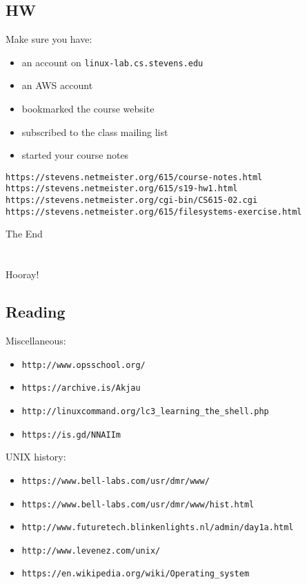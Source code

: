 \documentclass[xga]{xdvislides}
\begin{document}
\subsection{HW}
Make sure you have:
\begin{itemize}
	\item an account on {\tt linux-lab.cs.stevens.edu}
	\item an AWS account
	\item bookmarked the course website
	\item subscribed to the class mailing list
	\item started your course notes
\end{itemize}

\vspace*{\fill}
{\tt https://stevens.netmeister.org/615/course-notes.html} \\
{\tt https://stevens.netmeister.org/615/s19-hw1.html} \\
{\tt https://stevens.netmeister.org/cgi-bin/CS615-02.cgi} \\
{\tt https://stevens.netmeister.org/615/filesystems-exercise.html} \\
\vspace*{\fill}

\newpage
\vspace*{\fill}
\begin{center}
    \Hugesize
        The End \\ [1em]
    \hspace*{5mm}
    \blueline\\
    \hspace*{5mm}\\
        Hooray!
\end{center}
\vspace*{\fill}

\subsection{Reading}
Miscellaneous:
\begin{itemize}
	\item \verb+http://www.opsschool.org/+
	\item \verb+https://archive.is/Akjau+
	\item \verb+http://linuxcommand.org/lc3_learning_the_shell.php+
	\item \verb+https://is.gd/NNAIIm+
\end{itemize}

UNIX history:
\begin{itemize}
	\item \verb+https://www.bell-labs.com/usr/dmr/www/+
	\item \verb+https://www.bell-labs.com/usr/dmr/www/hist.html+
	\item \verb+http://www.futuretech.blinkenlights.nl/admin/day1a.html+
	\item \verb+http://www.levenez.com/unix/+
	\item \verb+https://en.wikipedia.org/wiki/Operating_system+
\end{itemize}
\end{document}
